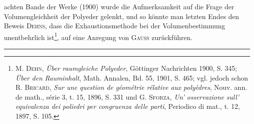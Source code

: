 achten Bande der Werke (1900) wurde die Aufmerksamkeit auf die Frage
der Volumengleichheit der Polyeder gelenkt, und so könnte man letzten Endes
\clearpage{}\setcounter{footnote}{0}
\noindent den Beweis \textsc{Dehns}, dass die Exhaustionsmethode bei der Volumenbestimmung
unentbehrlich ist\footnote{M. \textsc{Dehn}, \textit{Über raumgleiche Polyeder}, Göttinger Nachrichten 1900, S. 345; \textit{Über den Rauminhalt}, Math. Annalen, Bd. 55, 1901, S. 465; vgl. jedoch schon R. \textsc{Bricard}, \textit{Sur une question de géométrie rélative aux polyèdres}, Nouv. ann. de math., série 3, t. 15, 1896, S. 331 und G. \textsc{Sforza}, \textit{Un’ osservazione sull’ equivalenza dei poliedri per congruenza delle parti}, Periodico di mat., t. 12, 1897, S. 105.}, auf eine Anregung von \textsc{Gauss} zurückführen.
\par\medskip\begin{center}\rule{0.18\textwidth}{0.3pt}\end{center}
\clearpage\endgroup
